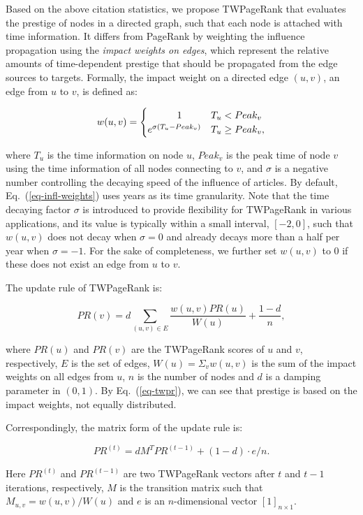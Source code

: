Based on the above citation statistics, we propose TWPageRank that evaluates the prestige of nodes in a directed graph, such that each node is attached with time information. It differs from PageRank by weighting the influence propagation using the {\em impact weights on edges}, which represent the relative amounts of time-dependent prestige that should be propagated from the edge sources to targets.
%
Formally, the impact weight on a directed edge $(u,v)$, \ie an edge from $u$ to $v$, is defined as:
\begin{small}
\begin{equation} \label{eq-infl-weights}
w(u,v)  =  \begin{cases}  \hspace{7ex} 1 & T_u <  Peak_v \\
  e^{\sigma(T_u-Peak_v)} & T_u \geq Peak_v,
\end{cases}
\end{equation}
\end{small}
%
\noindent where $T_u$ is the time information on node $u$, $Peak_v$ is the peak time of node $v$ using the time information of all nodes connecting to $v$, and $\sigma$ is a negative number controlling the decaying speed of the influence of articles.
By default, Eq.~(\ref{eq-infl-weights}) uses years as its time granularity. Note that the time decaying factor $\sigma$ is introduced to provide flexibility for TWPageRank in various applications, and its value is typically within a small interval, \eg $[-2,0]$, such that $w(u,v)$ does not decay when $\sigma=0$ and already decays more than a half per year when $\sigma=-1$.
For the sake of completeness, we further set $w(u,v)$ to $0$ if these does not exist an edge from $u$ to $v$.

The update rule of TWPageRank is:
\begin{small}
\begin{equation}\label{eq-twpr}
PR(v)=d\sum_{(u,v)\in E} \frac{w(u,v)PR(u)}{W(u)}+\frac{1-d}{n},
\end{equation}
\end{small}
%
\noindent where $PR(u)$ and $PR(v)$ are the TWPageRank scores of $u$ and $v$, respectively, $E$ is the set of edges, $W(u)=\Sigma_{v} w(u,v)$ is the sum of the impact weights on all edges from $u$, $n$ is the number of nodes and $d$ is a damping parameter in $(0, 1)$. By Eq.~(\ref{eq-twpr}), we can see that prestige is based on the impact weights, not equally distributed.

Correspondingly, the matrix form of the update rule is:
\begin{small}
\begin{equation}
\label{eq-twpr-update}
PR^{(t)}=d M^T  PR^{(t-1)} + (1-d)\cdot e/n.
\end{equation}
\end{small}
%
\noindent
Here $PR^{(t)}$ and $PR^{(t-1)}$ %
are two TWPageRank vectors after $t$ and $t-1$ iterations, respectively, $M$ is the transition matrix such that $M_{u,v}=w(u,v)/W(u)$ and $e$ is an $n$-dimensional vector $[1]_{n\times1}$.

